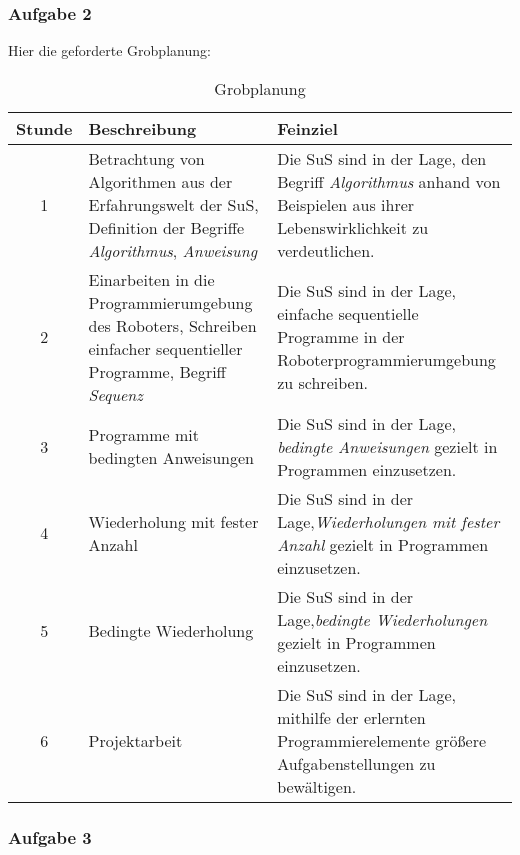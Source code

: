 \subsubsection{Aufgabe 2}
Hier die geforderte Grobplanung:

\begin{table}[H] %
	\centering
	\begin{tabularx}{\textwidth}{|c|>{\raggedright\arraybackslash}X|>{\raggedright\arraybackslash}X|}
		\hline
		Stunde & Beschreibung & Feinziel \\
		\hline
		1 & Betrachtung von Algorithmen aus der Erfahrungswelt der SuS,
		Definition der Begriffe \emph{Algorithmus}, \emph{Anweisung} & Die SuS
		sind in der Lage, den Begriff \emph{Algorithmus} anhand von Beispielen
		aus ihrer Lebenswirklichkeit zu verdeutlichen. \\
		\hline
		2 & Einarbeiten in die Programmierumgebung des Roboters, Schreiben
		einfacher sequentieller Programme, Begriff \emph{Sequenz} & Die SuS sind
		in der Lage, einfache sequentielle Programme in der 
		Roboterprogrammierumgebung zu schreiben.
		\\
		\hline
		3 & Programme mit bedingten Anweisungen & Die SuS sind in der Lage,
		\emph{bedingte Anweisungen} gezielt in Programmen einzusetzen. \\
		\hline
		4 & Wiederholung mit fester Anzahl & Die SuS sind in der
		Lage,\emph{Wiederholungen mit fester Anzahl} gezielt in Programmen
		einzusetzen. \\
		\hline
		5 & Bedingte Wiederholung & Die SuS sind in der
		Lage,\emph{bedingte Wiederholungen} gezielt in Programmen einzusetzen.
		\\
		\hline
		6 & Projektarbeit & Die SuS sind in der Lage, mithilfe der erlernten
		Programmierelemente größere Aufgabenstellungen zu bewältigen. \\
		\hline
	\end{tabularx}
	\caption{Grobplanung}
\end{table}

\subsubsection{Aufgabe 3}


